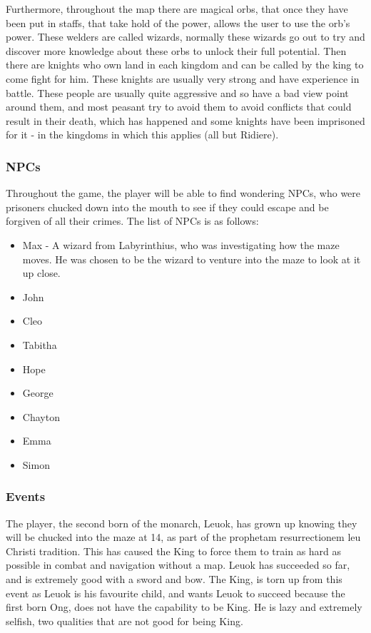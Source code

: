 \documentclass{article}
\begin{document}
\begin{itemize}
                \end{itemize}

                Furthermore, throughout the map there are magical orbs, that once they have been put in staffs, that take hold of the power, allows the user to use the orb's power. These welders are called wizards, normally these wizards go out to try and discover more knowledge about these orbs to unlock their full potential. Then there are knights who own land in each kingdom and can be called by the king to come fight for him. These knights are usually very strong and have experience in battle. These people are usually quite aggressive and so have a bad view point around them, and most peasant try to avoid them to avoid conflicts that could result in their death, which has happened and some knights have been imprisoned for it - in the kingdoms in which this applies (all but Ridiere).

            \clearpage
            \subsubsection{NPCs}
                Throughout the game, the player will be able to find wondering NPCs, who were prisoners chucked down into the mouth to see if they could escape and be forgiven of all their crimes. The list of NPCs is as follows:
                \begin{itemize}
                    \item Max - A wizard from Labyrinthius, who was investigating how the maze moves. He was chosen to be the wizard to venture into the maze to look at it up close.
                    \item John
                    \item Cleo
                    \item Tabitha
                    \item Hope
                    \item George
                    \item Chayton
                    \item Emma
                    \item Simon
                \end{itemize}
            \subsubsection{Events}
                The player, the second born of the monarch, Leuok, has grown up knowing they will be chucked into the maze at 14, as part of the prophetam resurrectionem leu Christi tradition. This has caused the King to force them to train as hard as possible in combat and navigation without a map. Leuok has succeeded so far, and is extremely good with a sword and bow. The King, is torn up from this event as Leuok is his favourite child, and wants Leuok to succeed because the first born Ong, does not have the capability to be King. He is lazy and extremely selfish, two qualities that are not good for being King.
\end{document}
